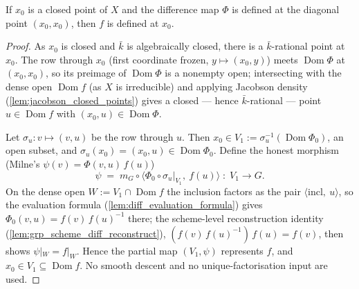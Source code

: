 \begin{theorem}
  \label{thm:row_section}
  \leanok
  If \(x_0\) is a closed point of \(X\) and the difference map \(\Phi\) is defined
  at the diagonal point \((x_0, x_0)\), then \(f\) is defined at \(x_0\).
\end{theorem}
\begin{proof}
  \leanok
  As \(x_0\) is closed and \(\bar k\) is algebraically closed, there is a
  \(\bar k\)-rational point at \(x_0\). The row through \(x_0\) (first coordinate
  frozen, \(y \mapsto (x_0, y)\)) meets \(\operatorname{Dom}\Phi\) at
  \((x_0, x_0)\), so its preimage of \(\operatorname{Dom}\Phi\) is a nonempty
  open; intersecting with the dense open \(\operatorname{Dom} f\) (as \(X\) is
  irreducible) and applying Jacobson density (\ref{lem:jacobson_closed_points})
  gives a closed --- hence \(\bar k\)-rational --- point \(u \in
  \operatorname{Dom} f\) with \((x_0, u) \in \operatorname{Dom}\Phi\).

  Let \(\sigma_u : v \mapsto (v, u)\) be the row through \(u\). Then \(x_0 \in
  V_1 := \sigma_u^{-1}(\operatorname{Dom}\Phi_0)\), an open subset, and
  \(\sigma_u(x_0) = (x_0, u) \in \operatorname{Dom}\Phi_0\). Define the honest
  morphism (Milne's \(\psi(v) = \Phi(v, u)\,f(u)\))
  \[
    \psi \;=\; m_G \circ \bigl\langle \Phi_0 \circ \sigma_u|_{V_1},\ f(u)\bigr\rangle
    \;:\; V_1 \longrightarrow G .
  \]
  On the dense open \(W := V_1 \cap \operatorname{Dom} f\) the inclusion factors
  as the pair \(\langle \text{incl},\ u\rangle\), so the evaluation formula
  (\ref{lem:diff_evaluation_formula}) gives \(\Phi_0(v, u) = f(v)\,f(u)^{-1}\)
  there; the scheme-level reconstruction identity
  (\ref{lem:grp_scheme_diff_reconstruct}), \((f(v)\,f(u)^{-1})\,f(u) = f(v)\),
  then shows \(\psi|_W = f|_W\). Hence the partial map \((V_1, \psi)\) represents
  \(f\), and \(x_0 \in V_1 \subseteq \operatorname{Dom} f\). No smooth descent and
  no unique-factorisation input are used.
\end{proof}

